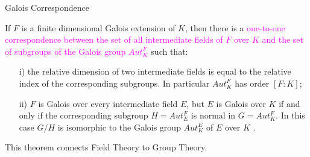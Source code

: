 \documentclass{beamer}
\begin{document}
\begin{frame}{Galois Correspondence}
    \begin{tcolorbox}[colback=white, colframe=blue!40, boxsep=1mm]
  \begin{theorem}
  If \(F\) is a finite dimensional Galois extension of \(K\), then there is a \textcolor{magenta}{one-to-one correspondence between the set of all intermediate fields of \(F\) over \(K\) and the set of subgroups of the Galois group \(Aut_K^F\)} such that:
  \begin{enumerate}
  \item[i)] the relative dimension of two intermediate fields is equal to the relative index of the corresponding subgroups. In particular \(Aut_K^F\) has order \([F:K]\);
  \item[ii)] \(F\) is Galois over every intermediate field \(E\), but \(E\) is Galois over \(K\) if and only if the corresponding subgroup \(H= Aut_E^F\) is normal in \(G=Aut_K^F\). In this case \(G/H\) is isomorphic to the Galois group \(Aut_K^E\) of \(E\) over \(K\) \cite{hunger}.
  \end{enumerate}
\end{theorem}
\end{tcolorbox}
\vspace{2mm}
\textcolor{green!40!black}{This theorem connects Field Theory to Group Theory.}
\end{frame}
\end{document}
